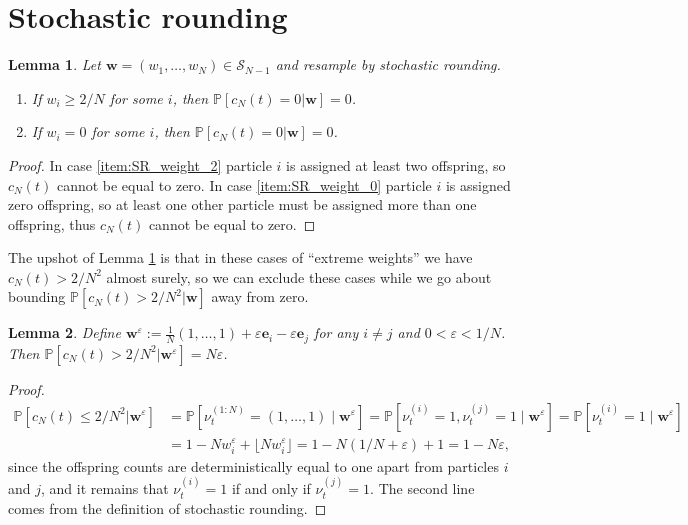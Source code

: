 \documentclass{article}
\newtheorem{lemma}{Lemma}
\newcommand{\PR}{\mathbb{P}}
\begin{document}
\section*{Stochastic rounding}
\begin{lemma} \label{lem:extreme_w_coal_as}
Let $\mathbf{w} = (w_1,\dots,w_N) \in \mathcal{S}_{N-1}$ and resample by stochastic rounding.
\begin{enumerate}[label=(\roman*)]
\item If $w_i \geq 2/N$ for some $i$, then $\PR[c_N(t) =0 |\mathbf{w} ] =0$. \label{item:SR_weight_2}
\item If $w_i= 0$ for some $i$, then $\PR[c_N(t) =0 |\mathbf{w} ] =0$. \label{item:SR_weight_0}
\end{enumerate}
\end{lemma}

\begin{proof}
In case \ref{item:SR_weight_2} particle $i$ is assigned at least two offspring, so $c_N(t)$ cannot be equal to zero.
In case \ref{item:SR_weight_0} particle $i$ is assigned zero offspring, so at least one other particle must be assigned more than one offspring, thus $c_N(t)$ cannot be equal to zero.
\end{proof}

The upshot of Lemma \ref{lem:extreme_w_coal_as} is that in these cases of ``extreme weights'' we have $c_N(t) > 2/N^2$ almost surely, so we can exclude these cases while we go about bounding $\PR[c_N(t) > 2/N^2 | \mathbf{w}]$ away from zero.


\begin{lemma}\label{lem:weps_cN_prob}
Define $\mathbf{w}^\varepsilon := \frac{1}{N}(1,\dots,1) + \varepsilon \mathbf{e}_i - \varepsilon \mathbf{e}_j$ for any $i \neq j$ and $0< \varepsilon < 1/N$. Then $\PR[c_N(t) > 2/N^2 | \mathbf{w}^\varepsilon] = N\varepsilon$.
\end{lemma}

\begin{proof}
\begin{align*}
\PR[c_N(t) \leq 2/N^2 | \mathbf{w}^\varepsilon]
&= \PR[\nu_t^{(1:N)} = (1,\dots, 1) \mid \mathbf{w}^\varepsilon] 
= \PR[\nu_t^{(i)} = 1, \nu_t^{(j)} = 1 \mid \mathbf{w}^\varepsilon] 
= \PR[\nu_t^{(i)} = 1 \mid \mathbf{w}^\varepsilon] \\
&= 1- N w_i^\varepsilon + \lfloor N w_i^\varepsilon \rfloor 
= 1- N(1/N + \varepsilon) + 1
= 1 - N\varepsilon ,
\end{align*}
since the offspring counts are deterministically equal to one apart from particles $i$ and $j$, and it remains that $\nu_t^{(i)} = 1$ if and only if $\nu_t^{(j)} = 1$. The second line comes from the definition of stochastic rounding.
\end{proof}
\end{document}
